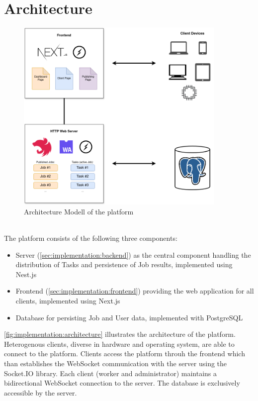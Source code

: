 \section{Architecture}
\label{sec:implementation:architecture}
\begin{figure}[htbp]
    \centering
    \includegraphics[width=0.9\textwidth]{gfx/figures/WebAssembly-MA.png}
    \caption{Architecture Modell of the platform}
    \label{fig:implementation:architecture}
\end{figure}
~\\
The platform consists of the following three components:
\begin{itemize}
    \item Server (\autoref{sec:implementation:backend}) as the central component handling the distribution of Tasks and persistence of Job results, implemented using Nest.js \cite{methodology:nestjs}
    \item Frontend (\autoref{sec:implementation:frontend}) providing the web application for all clients, implemented using Next.js \cite{methodology:nextjs}
    \item Database for persisting Job and User data, implemented with PostgreSQL \cite{methodology:db}
\end{itemize}
\autoref{fig:implementation:architecture} illustrates the architecture of the platform. Heterogenous clients, diverse in hardware and operating system, are able to connect to the platform. Clients access the platform throuh the frontend which than establishes the WebSocket communication with the server using the Socket.IO \cite{methodology:websockets2} library. Each client (worker and administrator) maintains a bidirectional WebSocket connection to the server. The database is exclusively accessible by the server.

